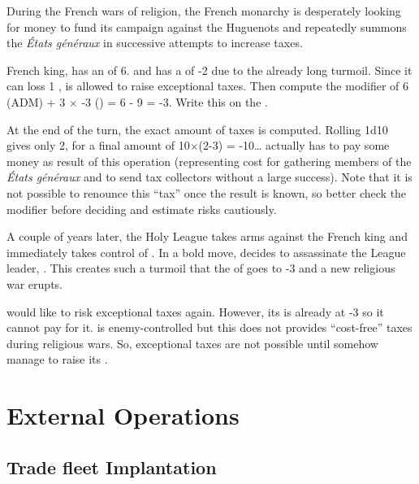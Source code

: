 \begin{exemple}
  During the French wars of religion, the French monarchy is desperately
  looking for money to fund its campaign against the Huguenots and repeatedly
  summons the \emph{États généraux} in successive attempts to increase taxes.

  French king,  has an \ADM of 6. and \FRA has a \STAB of
  -2 due to the already long turmoil. Since it can loss 1 \STAB, \FRA is
  allowed to raise exceptional taxes. Then compute the modifier of 6 (ADM) + 3
  $\times$ -3 (\STAB) = 6 - 9 = -3. Write this on the \EcoRS.

  At the end of the turn, the exact amount of taxes is computed. Rolling 1d10
  gives only 2, for a final amount of 10$\times$(2-3) = -10\ducats\ldots \FRA
  actually has to pay some money as result of this operation (representing
  cost for gathering members of the \emph{États généraux} and to send tax
  collectors without a large success). Note that it is not possible to
  renounce this ``tax'' once the result is known, so better check the
  modifier before deciding and estimate risks cautiously.

  \smallskip

  A couple of years later, the Holy League takes arms against the French king
  and immediately takes control of \villeParis. In a bold move,
   decides to assassinate the League leader,
  \leaderGuise. This creates such a turmoil that the \STAB of \FRA goes to -3
  and a new religious war erupts.

  \FRA would like to risk exceptional taxes again. However, its \STAB is
  already at -3 so it cannot pay for it. \villeParis is enemy-controlled but
  this does not provides ``cost-free'' taxes during religious wars. So,
  exceptional taxes are not possible until \FRA somehow manage to raise its
  \STAB.
\end{exemple}




\section{External Operations}



\subsection{Trade fleet Implantation}

